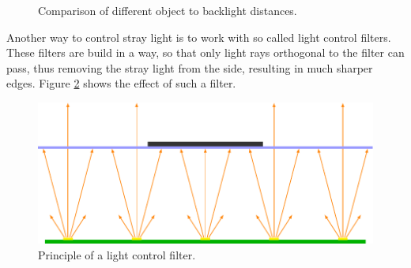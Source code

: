 \begin{figure}[ht]
	\centering
	\caption{Comparison of different object to backlight distances.\label{theory:thre}}	
\end{figure}

Another way to control stray light is to work with so called light control filters.
These filters are build in a way, so that only light rays orthogonal to the filter can pass, thus removing the stray light from the side, resulting in much sharper edges.
Figure \ref{theory:filter} shows the effect of such a filter.
\begin{figure}[ht]
	\centering
	\includegraphics[width=0.9\linewidth]{2-theory/backlight/object_filter.pdf}
	\caption{Principle of a light control filter.\label{theory:filter}}	
\end{figure}

